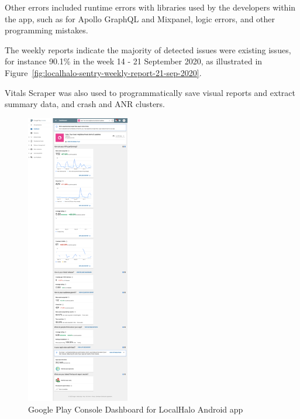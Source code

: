 Other errors included runtime errors with libraries used by the developers within the app, such as for Apollo GraphQL and Mixpanel, logic errors, and other programming mistakes. 

The weekly reports indicate the majority of detected issues were existing issues, for instance 90.1\% in the week 14 - 21 September 2020, as illustrated in Figure~\ref{fig:localhalo-sentry-weekly-report-21-sep-2020}.



Vitals Scraper was also used to programmatically save visual reports and extract summary data, and crash and ANR clusters.



\begin{figure}
  \begin{center}
    \includegraphics[width=0.4\textwidth]{images/google-play-console/resized-25pct-appdashboardplace_555059634831.png}
  \end{center}
  \caption{Google Play Console Dashboard for LocalHalo Android app}
  \label{fig:gpc-dashboard-for-localhalo-android-resized}
\end{figure}



